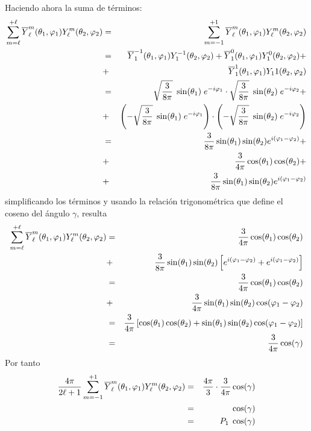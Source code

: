 Haciendo ahora la suma de términos:
\begin{eqnarray*}
\sum_{m = \ell}^{+\ell} \overline{Y}_{\ell}^{m} (\theta_{1}, \varphi_{1}) Y_{\ell}^{m}(\theta_{2}, \varphi_{2}) &=& \sum_{m = -1}^{+1} \overline{Y}_{\ell}^{m} (\theta_{1}, \varphi_{1}) Y_{\ell}^{m}(\theta_{2}, \varphi_{2}) \nonumber \\
&=& \overline{Y}_{1}^{-1} (\theta_{1}, \varphi_{1}) Y_{1}^{-1}(\theta_{2}, \varphi_{2}) + \overline{Y}_{1}^{0} (\theta_{1}, \varphi_{1}) Y_{1}^{0}(\theta_{2}, \varphi_{2}) + \nonumber \\
&+& \overline{Y}_{1}^{1} (\theta_{1}, \varphi_{1}) Y_{1}{1}(\theta_{2}, \varphi_{2}) \nonumber \\
&=& \sqrt{\dfrac{3}{8 \pi}} \; \sin (\theta_{1}) \; e^{-i \varphi_{1}} \cdot \sqrt{\dfrac{3}{8 \pi}} \; \sin (\theta_{2}) \; e^{-i \varphi_{2}} + \nonumber \\
&+& \left( - \sqrt{\dfrac{3}{8 \pi}} \; \sin (\theta_{1}) \; e^{-i \varphi_{1}} \right) \cdot \left( - \sqrt{\dfrac{3}{8 \pi}} \; \sin (\theta_{2}) \; e^{-i \varphi_{2}} \right) \nonumber \\
&=& \dfrac{3}{8 \pi} \sin (\theta_{1}) \sin (\theta_{2}) e^{i(\varphi_{1} - \varphi_{2})} + \nonumber \\
&+& \dfrac{3}{4 \pi} \cos(\theta_{1}) \cos(\theta_{2}) + \nonumber \\
&+& \dfrac{3}{8 \pi} \sin(\theta_{1}) \sin(\theta_{2}) e^{i(\varphi_{1} - \varphi_{2})}
\end{eqnarray*}
simplificando los términos y usando la relación trigonométrica que define el coseno del ángulo $\gamma$, resulta
\begin{eqnarray*}
\sum_{m = \ell}^{+\ell} \overline{Y}_{\ell}^{m} (\theta_{1}, \varphi_{1}) Y_{\ell}^{m}(\theta_{2}, \varphi_{2}) &=& \dfrac{3}{4 \pi} \cos(\theta_{1}) \cos(\theta_{2}) \nonumber \\
&+& \dfrac{3}{8 \pi} \sin(\theta_{1}) \sin (\theta_{2}) \left[ e^{i(\varphi_{1} - \varphi_{2})} + e^{i(\varphi_{1} - \varphi_{2})} \right] \nonumber \\
&=& \dfrac{3}{4 \pi} \cos(\theta_{1}) \cos(\theta_{2}) \nonumber \\
&+& \dfrac{3}{4 \pi} \sin(\theta_{1}) \sin (\theta_{2}) \cos(\varphi_{1} - \varphi_{2}) \nonumber \\
&=& \dfrac{3}{4 \pi} \left[ \cos(\theta_{1}) \cos (\theta_{2}) + \sin (\theta_{1}) \sin (\theta_{2}) \cos(\varphi_{1} - \varphi_{2}) \right] \nonumber \\
&=& \dfrac{3}{4 \pi} \cos (\gamma)
\end{eqnarray*}
Por tanto
\begin{eqnarray*}
\dfrac{4 \pi}{2 \ell + 1} \sum_{m = -1}^{+1} \overline{Y}_{\ell}^{m} (\theta_{1}, \varphi_{1}) Y_{\ell}^{m}(\theta_{2}, \varphi_{2}) &=& \dfrac{4 \pi}{3} \cdot \dfrac{3}{4 \pi} \cos (\gamma) \nonumber \\
&=& \cos(\gamma) \nonumber \\
&=& P_{1} \; \cos(\gamma)
\end{eqnarray*}
